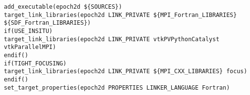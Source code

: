 \begin{lstlisting}[style=FORTRAN, caption=CMakeLists]
add_executable(epoch2d ${SOURCES})
target_link_libraries(epoch2d LINK_PRIVATE ${MPI_Fortran_LIBRARIES} ${SDF_Fortran_LIBRARIES})
if(USE_INSITU)
target_link_libraries(epoch2d LINK_PRIVATE vtkPVPythonCatalyst vtkParallelMPI)
endif()
if(TIGHT_FOCUSING)
target_link_libraries(epoch2d LINK_PRIVATE ${MPI_CXX_LIBRARIES} focus)
endif()
set_target_properties(epoch2d PROPERTIES LINKER_LANGUAGE Fortran)
\end{lstlisting}